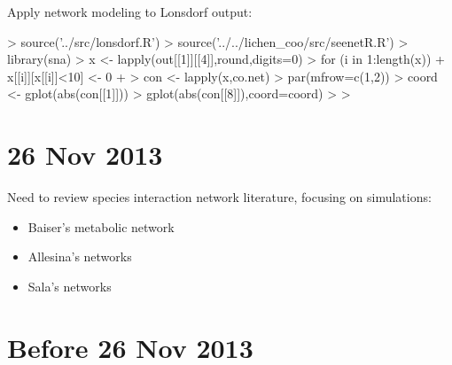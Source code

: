 \documentclass[12pt]{article}
\begin{document}
Apply network modeling to Lonsdorf output:

\begin{Schunk}
\begin{Sinput}
> source('../src/lonsdorf.R')
> source('../../lichen_coo/src/seenetR.R')
> library(sna)
> x <- lapply(out[[1]][[4]],round,digits=0)
> for (i in 1:length(x)){
+   x[[i]][x[[i]]<10] <- 0
+ }
> con <- lapply(x,co.net)
> par(mfrow=c(1,2))
> coord <- gplot(abs(con[[1]]))
> gplot(abs(con[[8]]),coord=coord)
> 
> 
\end{Sinput}
\end{Schunk}

\section{26 Nov 2013}


Need to review species interaction network literature, focusing on
simulations:

\begin{itemize}
\item Baiser's metabolic network
\item Allesina's networks
\item Sala's networks
\end{itemize}


\section{Before 26 Nov 2013}
\end{document}
